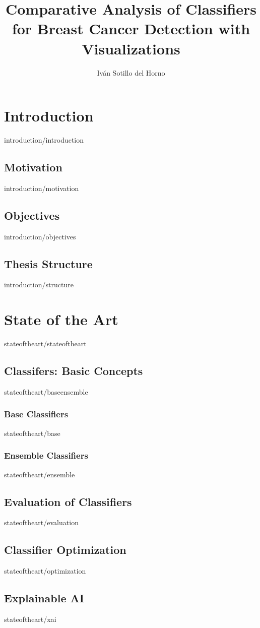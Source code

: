 \documentclass[covers, firstnumbered, tfg, extendedindex, epsbased, english, final]{tfgtfmthesisuam}
\title{Comparative Analysis of Classifiers for Breast Cancer Detection with Visualizations}
\author{Iván Sotillo del Horno}
\begin{document}
\chapter{Introduction\label{CAP:INTRODUCTION}}{introduction/introduction}
\section{Motivation}{introduction/motivation}
\section{Objectives}{introduction/objectives}
\section{Thesis Structure}{introduction/structure}

\chapter{State of the Art\label{CAP:STATEOFTHEART}}{stateoftheart/stateoftheart}
\section{Classifers: Basic Concepts\label{SEC:BASEENSEMBLE}}{stateoftheart/baseensemble}
\subsection{Base Classifiers}{stateoftheart/base}
\subsection{Ensemble Classifiers\label{SEC:ENSEMBLE}}{stateoftheart/ensemble}
\section{Evaluation of Classifiers\label{SEC:EVALUATION}}{stateoftheart/evaluation}
\section{Classifier Optimization\label{SEC:OPTIMIZATION}}{stateoftheart/optimization}

\section{Explainable AI}{stateoftheart/xai}
\end{document}
